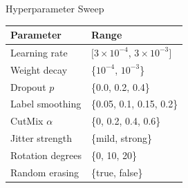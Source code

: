 \documentclass[aspectratio=169]{beamer}
\begin{document}
\begin{frame}{Hyperparameter Sweep}

    \begin{table}[H]
        \centering
        \renewcommand{\arraystretch}{1.25}
        \begin{tabular}{ll}
        \toprule
        Parameter & Range \\
        \midrule
        Learning rate    & $[3\times10^{-4}$, $3\times10^{-3}]$ \\ %
        Weight decay     & \{$10^{-4}$, $10^{-3}$\} \\
        Dropout $p$      & \{0.0, 0.2, 0.4\} \\
        Label smoothing  & \{0.05, 0.1, 0.15, 0.2\} \\
        CutMix $\alpha$  & \{0, 0.2, 0.4, 0.6\} \\
        Jitter strength  & \{mild, strong\} \\
        Rotation degrees & \{0, 10, 20\} \\
        Random erasing   & \{true, false\} \\
        \bottomrule
        \end{tabular}
    \end{table}
\end{frame}
\end{document}
